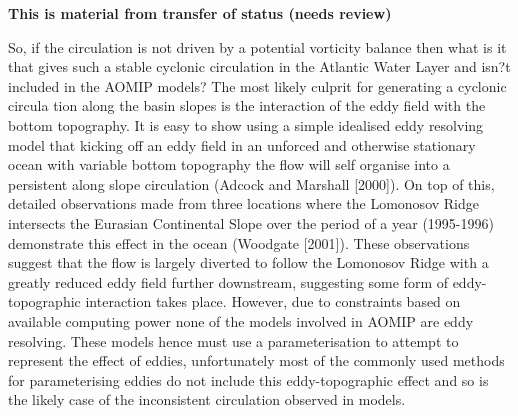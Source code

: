 \documentclass[10pt,a4paper]{article}
\begin{document}
\textbf{This is material from transfer of status (needs review)}



So, if the circulation is not driven by a potential vorticity balance then what is it that gives such a stable cyclonic circulation in the Atlantic Water Layer and isn?t included in the AOMIP models? The most likely culprit for generating a cyclonic circula tion along the basin slopes is the interaction of the eddy field with the bottom topography. It is easy to show using a simple idealised eddy resolving model that kicking off an eddy field in an unforced and otherwise stationary ocean with variable bottom topography the flow will self organise into a persistent along slope circulation (Adcock and Marshall [2000]). On top of this, detailed observations made from three locations where the Lomonosov Ridge intersects the Eurasian Continental Slope over the period of a year (1995-1996) demonstrate this effect in the ocean (Woodgate [2001]). These observations suggest that the flow is 
largely diverted to follow the Lomonosov Ridge with a greatly reduced eddy field further downstream, suggesting some form of eddy-topographic interaction takes place. However, due to constraints based on available computing power none of the models involved in AOMIP are eddy resolving. These models hence must use a parameterisation to attempt to represent the effect of eddies, unfortunately most of the commonly used methods for parameterising eddies do not include this eddy-topographic effect and so is the likely case of the inconsistent circulation observed in models. 
\end{document}
